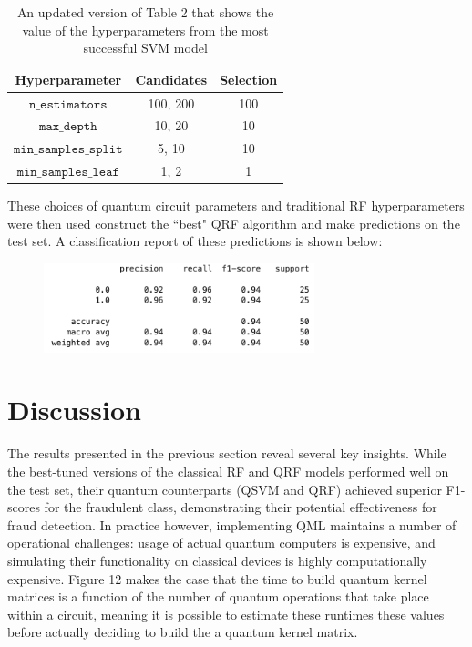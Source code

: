\documentclass[11pt, oneside]{article}   	%
\begin{document}
\begin{table}[h!]
    \centering
    \begin{tabular}{|c|c|c|}
        \hline
        \textbf{Hyperparameter} & \textbf{Candidates} & \textbf{Selection}\\ \hline
        $\texttt{n\_estimators}$ &  100, 200 & 100 \\ \hline
        $\texttt{max\_depth}$ & 10, 20 & 10\\ \hline
        $\texttt{min\_samples\_split}$ & 5, 10 & 10\\ \hline
        $\texttt{min\_samples\_leaf}$ & 1, 2 & 1 \\ \hline
    \end{tabular}
    \caption{An updated version of Table 2 that shows the value of the hyperparameters from the most successful SVM model}
    \label{tab8}
\end{table}

These choices of quantum circuit parameters and traditional RF hyperparameters were then used construct the ``best" QRF algorithm and make predictions on the test set. A classification report of these predictions is shown below: 


\begin{figure}[h!]
    \centering
    \includegraphics[width=0.7\textwidth]{figures/qrf_results.png}
    \captionsetup{font=small} 
    \label{fig14}
\end{figure}




\section{Discussion}

The results presented in the previous section reveal several key insights. While the best-tuned versions of the classical RF and QRF models performed well on the test set, their quantum counterparts (QSVM and QRF) achieved superior F1-scores for the fraudulent class, demonstrating their potential effectiveness for fraud detection. In practice however, implementing QML maintains a number of operational challenges: usage of actual quantum computers is expensive, and simulating their functionality on classical devices is highly computationally expensive. Figure 12 makes the case that the time to build quantum kernel matrices is a function of the number of quantum operations that take place within a circuit, meaning it is possible to estimate these runtimes these values before actually deciding to build the a quantum kernel matrix. \\
\end{document}
